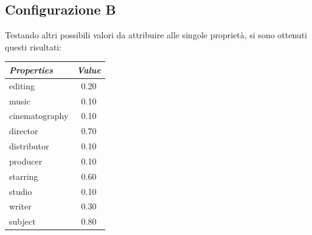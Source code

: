 \subsection{Configurazione B}
Testando altri possibili valori da attribuire alle singole proprietà, si sono ottenuti questi risultati:
\begin{table}[H]
	\small
	\centering
	\begin{tabular}{l c}
		\textit{Properties} & \textit{Value} \\\hline
		editing & 0.20 \\
		music & 0.10 \\
		cinematography & 0.10 \\
		director & 0.70 \\
		distributor & 0.10 \\
		producer & 0.10 \\
		starring & 0.60 \\
		studio & 0.10 \\
		writer & 0.30 \\
		subject & 0.80 \\
	\end{tabular}
\end{table}

